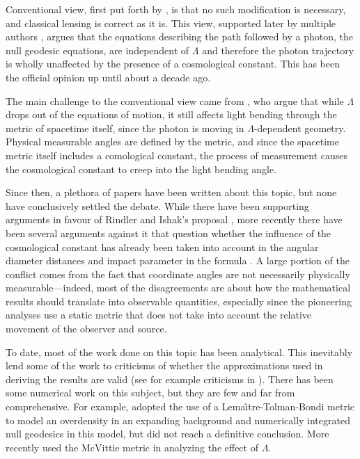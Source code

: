 Conventional view, first put forth by \citet{islam1983cosmological}, is that no such modification is necessary, and classical lensing is correct as it is. This view, supported later by multiple authors \citep{lake2002bending,park2008rigorous,simpson2010lensing,khriplovich2008does}, argues that the equations describing the path followed by a photon, the null geodesic equations, are independent of $\Lambda$ and therefore the photon trajectory is wholly unaffected by the presence of a cosmological constant. This has been the official opinion up until about a decade ago. 

The main challenge to the conventional view came from \citet{rindler2007contribution}, who argue that while $\Lambda$ drops out of the equations of motion, it still affects light bending through the metric of spacetime itself, since the photon is moving in $\Lambda$-dependent geometry. Physical measurable angles are defined by the metric, and since the spacetime metric itself includes a comological constant, the process of measurement causes the cosmological constant to creep into the light bending angle. 

Since then, a plethora of papers have been written about this topic, but none have conclusively settled the debate. While there have been supporting arguments in favour of Rindler and Ishak's proposal \citep{sereno2008influence,schucker2008strong,bhadra2010gravitational}, more recently there have been several arguments against it that question whether the influence of the cosmological constant has already been taken into account in the angular diameter distances and impact parameter in the formula \citep{arakida2012effect,butcher2016no,piattella2016lensing}. A large portion of the conflict comes from the fact that coordinate angles are not necessarily physically measurable---indeed, most of the disagreements are about how the mathematical results should translate into observable quantities, especially since the pioneering analyses use a static metric that does not take into account the relative movement of the observer and source. 


To date, most of the work done on this topic has been analytical. This inevitably lend some of the work to criticisms of whether the approximations used in deriving the results are valid (see for example criticisms in \citet{ishak2010more}). There has been some numerical work on this subject, but they are few and far from comprehensive. For example, \citet{beynon2012testing} adopted the use of a Lema{\^\i}tre-Tolman-Bondi metric to model an overdensity in an expanding background and numerically integrated null geodesics in this model, but did not reach a definitive conclusion. More recently \citep{aghili2017effect} used the McVittie metric \citep{mcvittie1933mass} in analyzing the effect of $\Lambda$. 

